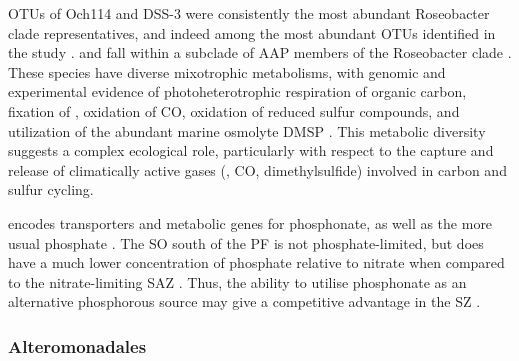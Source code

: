 \acp{OTU} of  Och114 and  DSS-3 were consistently the most abundant Roseobacter clade representatives, and indeed among the most abundant \acp{OTU} identified in the study .
 and  fall within a subclade of \ac{AAP} members of the Roseobacter clade \cite{Swingley:2007dm}.
These species have diverse mixotrophic metabolisms, with genomic and experimental evidence of photoheterotrophic respiration of organic carbon, fixation of , oxidation of CO, oxidation of reduced sulfur compounds, and utilization of the abundant marine osmolyte \ac{DMSP} \cite{King:2003kc,Moran:2004ie,WagnerDobler:2006kb,Swingley:2007dm,Brinkhoff:2008do,Howard:2008hf}.
This metabolic diversity suggests a complex ecological role, particularly with respect to the capture and release of climatically active gases (, CO, dimethylsulfide) involved in carbon and sulfur cycling.

 encodes transporters and metabolic genes for phosphonate, as well as the more usual phosphate \cite{Swingley:2007dm}.
The \ac{SO} south of the \ac{PF} is not phosphate-limited, but does have a much lower concentration of phosphate relative to nitrate when compared to the nitrate-limiting \ac{SAZ} \cite{Weber:2010fi}.
Thus, the ability to utilise phosphonate as an alternative phosphorous source may give  a competitive advantage in the \ac{SZ} \cite{Huang:2005ve}.

\subsubsection{Alteromonadales}

